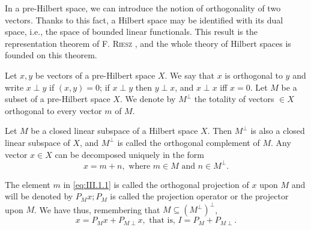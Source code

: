 \label{chap:III}


\label{sec:III.1}

In a pre-Hilbert space, we can introduce the notion of orthogonality of two vectors. Thanks to this fact, a Hilbert space may be identified with its dual space, i.e., the space of bounded linear functionals. This result is the representation theorem of F. \textsc{Riesz} \cite{rickart272}, and the whole theory of Hilbert spaces is founded on this theorem. 

\begin{definition}\label{def:III.1.Definition.1} Let $x, y$ be vectors of a pre-Hilbert space $X$. We say that $x$ is orthogonal to $y$ and write $x \perp y$ if $(x, y) = 0$; if $x \perp y$ then $y \perp x$, and $x \perp x$ iff $x = 0$. Let $M$ be a subset of a pre-Hilbert space $X$. We denote by $M^{\perp}$ the totality of vectors $\in X$ orthogonal to every vector $m$ of $M$. 
\end{definition}

\begin{theorem}\label{thm:III.1.Theorem.1} Let $M$ be a closed linear subspace of a Hilbert space $X$. Then $M^{\perp}$ is also a closed linear subspace of $X$, and $M^{\perp}$ is called the orthogonal complement of $M$. Any vector $x \in X$ can be decomposed uniquely in the form 
\begin{equation}\label{eq:III.1.1}
x = m + n, \text{ where } m \in M \text{ and } n \in M ^{\perp}.
\end{equation}
\end{theorem}

The element $m$ in \eqref{eq:III.1.1} is called the orthogonal projection of $x$ upon $M$ and will be denoted by $P_M x; P_M$ is called the projection operator or the projector upon $M$. We have thus, remembering that $M \subseteq (M^\perp)^\perp$, 
\begin{equation}\tag{1'}\label{eq:III.1.1'}
x = P _{M} x + P _{M \perp} x, \text{ that is, } I = P _{M} + P _{M \perp}.
\end{equation}

